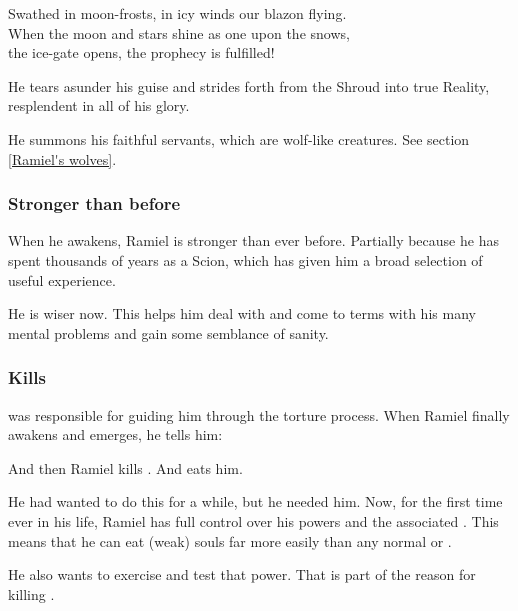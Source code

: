 \begin{garbage}
{  Swathed in moon-frosts, in icy winds our blazon flying. \\
  When the moon and stars shine as one upon the snows, \\
  the ice-gate opens, the prophecy is fulfilled!
}

He tears asunder his \human{} guise and strides forth from the Shroud into true Reality, resplendent in all of his \sathariah{} glory. 

He summons his faithful servants, which are wolf-like creatures. See section \ref{Ramiel's wolves}. 





\subsubsection{Stronger than before}
When he awakens, Ramiel is stronger than ever before. 
Partially because he has spent thousands of years  as a Scion, which has given him a broad selection of useful experience. 

He is wiser now. 
This helps him deal with and come to terms with his many mental problems and gain some semblance of sanity. 





\subsubsection{Kills \Gilchad}
\Gilchad{} was responsible for guiding him through the torture process. 
When Ramiel finally awakens and emerges, he tells him: 

And then Ramiel kills \Gilchad. 
And eats him. 

He had wanted to do this for a while, but he needed him. 
Now, for the first time ever in his life, Ramiel has full control over his \Malach{} powers and the associated \carcer. 
This means that he can eat (weak) souls far more easily than any normal \resphan{} or \dragon. 

He also wants to exercise and test that power. 
That is part of the reason for killing \Gilchad. 
















\end{garbage}
